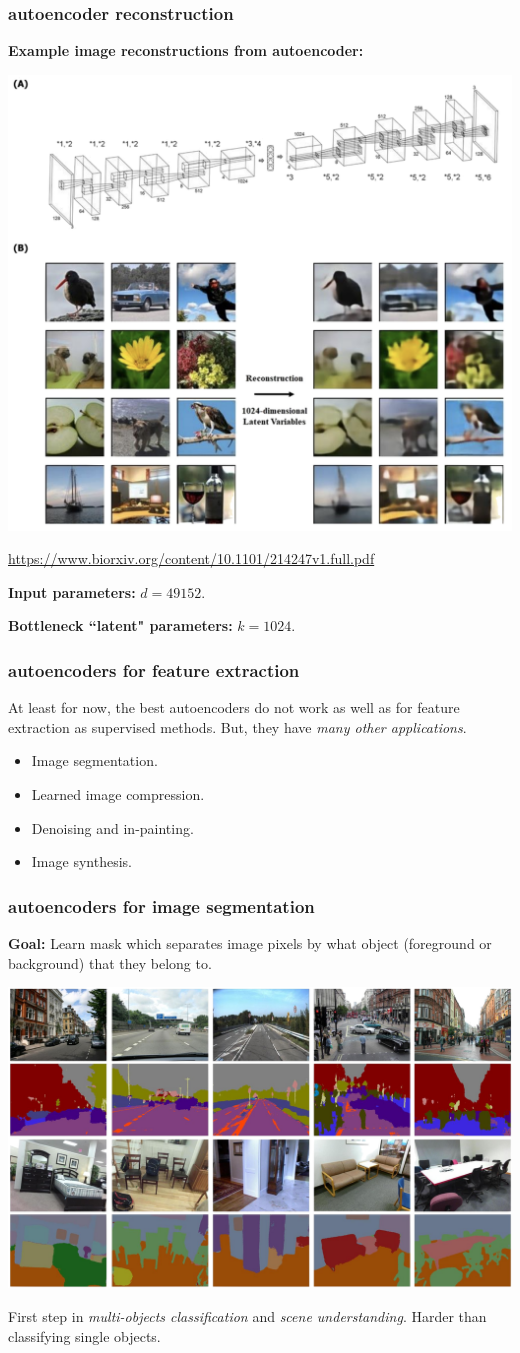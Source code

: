 \documentclass[handout,compress]{beamer}
\begin{document}
\begin{frame}
	\frametitle{autoencoder reconstruction}\small
	\textbf{Example image reconstructions from autoencoder:}
	\begin{center}
		\includegraphics[width=.55\textwidth]{reconstruction.png}
		
		\tiny{\url{https://www.biorxiv.org/content/10.1101/214247v1.full.pdf}}
	\end{center}
	\textbf{Input parameters:} $d = 49152$.\vspace{-.5em}
	
	\textbf{Bottleneck ``latent" parameters:} $k = 1024$.  
\end{frame}


\begin{frame}
	\frametitle{autoencoders for feature extraction}
	At least for now, the best autoencoders do not work as well as for feature extraction as supervised methods. But, they have \emph{many other applications}.
	\begin{itemize}
		\item Image segmentation.
		\item Learned image compression.
		\item Denoising and in-painting.
		\item Image synthesis.
	\end{itemize}
\end{frame}

\begin{frame}
	\frametitle{autoencoders for image segmentation}
	\textbf{Goal:} Learn mask which separates image pixels by what object (foreground or background) that they belong to.
	\begin{center}
		\includegraphics[width=.8\textwidth]{segment.png}
	\end{center}
	First step in \emph{multi-objects classification} and \emph{scene understanding}. Harder than classifying single objects.
\end{frame}
\end{document}
